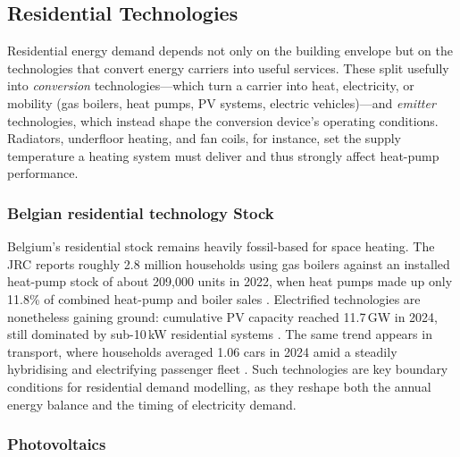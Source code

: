 
\subsection{Residential Technologies}
\label{sec:residentialTechnologies}

Residential energy demand depends not only on the building envelope but on the technologies that convert energy carriers into useful services. These split usefully into \textit{conversion} technologies—which turn a carrier into heat, electricity, or mobility (gas boilers, heat pumps, PV systems, electric vehicles)—and \textit{emitter} technologies, which instead shape the conversion device's operating conditions. Radiators, underfloor heating, and fan coils, for instance, set the supply temperature a heating system must deliver and thus strongly affect heat-pump performance.

\subsubsection*{Belgian residential technology Stock}
Belgium's residential stock remains heavily fossil-based for space heating. The JRC reports roughly 2.8 million households using gas boilers against an installed heat-pump stock of about 209,000 units in 2022, when heat pumps made up only 11.8\% of combined heat-pump and boiler sales \cite{JRC2022HeatPumpBelgium}. Electrified technologies are nonetheless gaining ground: cumulative PV capacity reached 11.7\,GW in 2024, still dominated by sub-10\,kW residential systems \cite{vermang2024_pvps_belgium}. The same trend appears in transport, where households averaged 1.06 cars in 2024 \cite{StatbelHouseholds2025} amid a steadily hybridising and electrifying passenger fleet \cite{Statbel2025EV}. Such technologies are key boundary conditions for residential demand modelling, as they reshape both the annual energy balance and the timing of electricity demand.

\subsubsection*{Photovoltaics}

